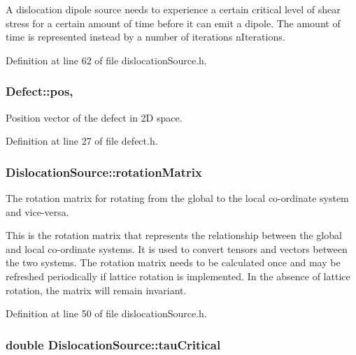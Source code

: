 A dislocation dipole source needs to experience a certain critical level of shear stress for a certain amount of time before it can emit a dipole. The amount of time is represented instead by a number of iterations n\-Iterations. 

Definition at line 62 of file dislocation\-Source.\-h.

\hypertarget{classDefect_aed2731c1beefc22e3db6ad5b18194cdd}{
\subsubsection[{pos}]{ Defect\-::pos\hspace{0.3cm}{\ttfamily [protected]}, {\ttfamily [inherited]}}}\label{d5/d4f/classDefect_aed2731c1beefc22e3db6ad5b18194cdd}


Position vector of the defect in 2\-D space. 



Definition at line 27 of file defect.\-h.

\hypertarget{classDislocationSource_a3bb826a0646d5c5546045cbf8d523b4f}{
\subsubsection[{rotation\-Matrix}]{ Dislocation\-Source\-::rotation\-Matrix\hspace{0.3cm}{\ttfamily [protected]}}}\label{de/de3/classDislocationSource_a3bb826a0646d5c5546045cbf8d523b4f}


The rotation matrix for rotating from the global to the local co-\/ordinate system and vice-\/versa. 

This is the rotation matrix that represents the relationship between the global and local co-\/ordinate systems. It is used to convert tensors and vectors between the two systems. The rotation matrix needs to be calculated once and may be refreshed periodically if lattice rotation is implemented. In the absence of lattice rotation, the matrix will remain invariant. 

Definition at line 50 of file dislocation\-Source.\-h.

\hypertarget{classDislocationSource_ad91294a3ab5b6f6156a2ad67b9df954e}{
\subsubsection[{tau\-Critical}]{\setlength{\rightskip}{0pt plus 5cm}double Dislocation\-Source\-::tau\-Critical\hspace{0.3cm}{\ttfamily [protected]}}}\label{de/de3/classDislocationSource_ad91294a3ab5b6f6156a2ad67b9df954e}


